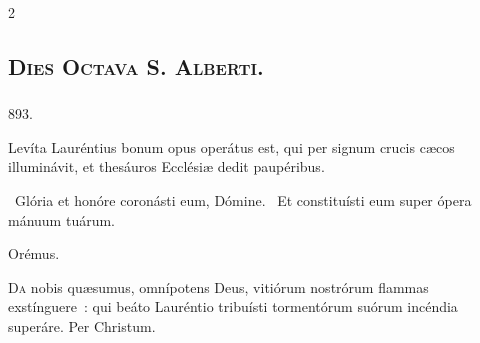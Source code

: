 \documentclass[9pt,twoside]{extarticle}
\begin{document}
\begin{multicols}{2}
{{%
%

\subsubsection*{\center {}}
\subsection*{\center \textsc{Dies Octava S. Alberti.}}
\subsubsection*{\center {}}

\begin{tightlist}{}
\item {} 893. 
\item {} Levíta Lauréntius bonum opus operátus est, qui per signum crucis cæcos illuminávit, et thesáuros Ecclésiæ dedit paupéribus.
\item {}~Glória et honóre coronásti eum, Dómine. ~Et constituísti eum super ópera mánuum tuárum.
\item Orémus. \hfill {}
\end{tightlist}
\lettrine{D}a nobis quæsumus, omnípotens Deus, vitiórum nostrórum flammas exstínguere~: qui beáto Lauréntio tribuísti tormentórum suórum incéndia superáre. Per Christum.


}}
\end{multicols}
\end{document}

